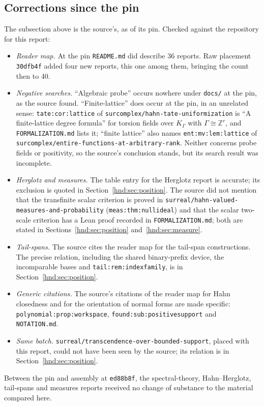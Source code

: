 \documentclass[11pt,oneside]{article}
\theoremstyle{definition}
\theoremstyle{remark}
\newcommand{\Z}{\mathbb Z}
\newcommand{\repo}[1]{\nolinkurl{#1}}%
\newcommand{\lbl}[1]{\nolinkurl{#1}}%
\begin{document}
\subsection{Corrections since the pin}\label{hnd:app:pinned}

The subsection above is the source's, as of its pin. Checked against the
repository for this report:
\begin{itemize}
\item \emph{Reader map.} At the pin \repo{README.md} did describe 36
reports. Raw placement \texttt{30dfb4f} added four new reports,
this one among them, bringing the count then to 40.
\item \emph{Negative searches.} ``Algebraic probe'' occurs nowhere under
\texttt{docs/} at the pin, as the source found. ``Finite-lattice'' does
occur at the pin, in an unrelated sense: \lbl{tate:cor:lattice} of
\repo{surcomplex/hahn-tate-uniformization} is ``A finite-lattice degree
formula'' for torsion fields over $K_\Gamma$ with $\Gamma\cong\Z^r$, and
\repo{FORMALIZATION.md} lists it; ``finite lattice'' also names
\lbl{ent:mv:lem:lattice} of \repo{surcomplex/entire-functions-at-arbitrary-rank}.
Neither concerns probe fields or positivity, so the source's conclusion
stands, but its search result was incomplete.
\item \emph{Herglotz and measures.} The table entry for the Herglotz report
is accurate; its exclusion is quoted in Section~\ref{hnd:sec:position}.
The source did not mention that the transfinite scalar criterion is proved
in \repo{surreal/hahn-valued-measures-and-probability}
(\lbl{meas:thm:nullideal}) and that the scalar two-scale criterion has a
Lean proof recorded in \repo{FORMALIZATION.md}; both are stated in
Sections~\ref{hnd:sec:position} and~\ref{hnd:sec:measure}.
\item \emph{Tail-spans.} The source cites the reader map for the
tail-span constructions. The precise relation, including the shared
binary-prefix device, the incomparable bases and \lbl{tail:rem:indexfamily},
is in Section~\ref{hnd:sec:position}.
\item \emph{Generic citations.} The source's citations of the reader map
for Hahn closedness and for the orientation of normal forms are made
specific: \lbl{polynomial:prop:workspace}, \lbl{found:sub:positivesupport}
and \repo{NOTATION.md}.
\item \emph{Same batch.} \repo{surreal/transcendence-over-bounded-support},
placed with this report, could not have been seen by the source; its
relation is in Section~\ref{hnd:sec:position}.
\end{itemize}
Between the pin and assembly at \texttt{ed88b8f}, the spectral-theory,
Hahn--Herglotz, tail-spans and measures reports received no change of
substance to the material compared here.
\end{document}
